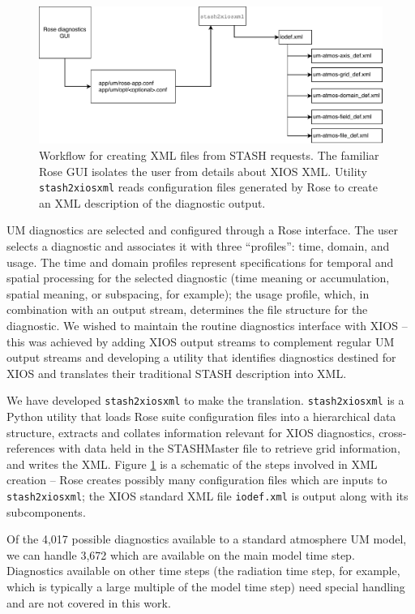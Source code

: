\documentclass[twocolumn, 12pt]{paper}
\begin{document}
\begin{figure}[H]
	\centerline{
	\includegraphics[scale=0.5]{figures/stash2xiosxml.pdf}
	}
	\caption {Workflow for creating XML files from STASH requests. The familiar Rose GUI isolates the user from details about XIOS XML. Utility \texttt{stash2xiosxml} reads configuration files generated by Rose to create an XML description of the diagnostic output.}
	\label{stash2xiosxml}
\end{figure}

UM diagnostics are selected and configured through a Rose interface.
The user selects a diagnostic and associates it with three ``profiles'': time, domain, and usage.
The time and domain profiles represent specifications for temporal and spatial processing for the selected diagnostic (time meaning or accumulation, spatial meaning, or subspacing, for example); the usage profile, which, in combination with an output stream, determines the file structure for the diagnostic.
We wished to maintain the routine diagnostics interface with XIOS -- this was achieved by adding XIOS output streams to complement regular UM output streams and developing a utility that identifies diagnostics destined for XIOS and translates their traditional STASH description into XML.

We have developed \texttt{stash2xiosxml} to make the translation.
\texttt{stash2xiosxml} is a Python utility that loads Rose suite configuration files into a hierarchical data structure, extracts and collates information relevant for XIOS diagnostics, cross-references with data held in the STASHMaster file to retrieve grid information, and writes the XML.
Figure \ref{stash2xiosxml} is a schematic of the steps involved in XML creation -- Rose creates possibly many configuration files which are inputs to \texttt{stash2xiosxml}; the XIOS standard XML file \texttt{iodef.xml} is output along with its subcomponents.

Of the 4,017 possible diagnostics available to a standard atmosphere UM model, we can handle 3,672 which are available on the main model time step.
Diagnostics available on other time steps (the radiation time step, for example, which is typically a large multiple of the model time step) need special handling and are not covered in this work.
\end{document}
